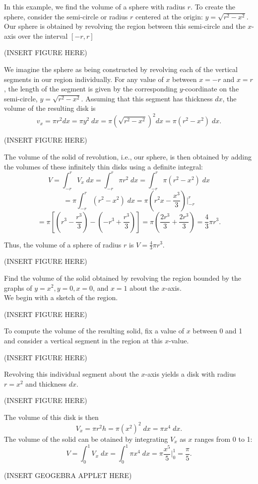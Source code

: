 \documentclass{ximera}
\begin{document}
\begin{example}
In this example, we find the volume of a sphere with radius $r$.
To create the sphere, consider the semi-circle or radius $r$ centered at the origin: $y = \sqrt{r^2 - x^2}$.
Our sphere is obtained by revolving the region between this semi-circle and the $x$-axis over the interval $[-r,r]$

(INSERT FIGURE HERE)

We imagine the sphere as being constructed by revolving each of the vertical segments in our region individually.
For any value of $x$ between $x = -r$ and $x = r$, the length of the segment is given by the corresponding $y$-coordinate
on the semi-circle, $y = \sqrt{r^2 - x^2}$. Assuming that this segment has thickness $dx$, the volume of the resulting disk is 
\[
v_x = \pi r^2 dx = \pi y^2 \; dx = \pi \left(\sqrt{r^2 - x^2}\right)^2 dx = \pi (r^2 - x^2)\; dx.
\]

(INSERT FIGURE HERE)

The volume of the solid of revolution, i.e., our sphere, is then obtained by adding the volumes of these infinitely thin disks using a definite integral:
\[
V = \int_{-r}^r V_x \; dx = \int_{-r}^r \pi r^2 \; dx = \int_{-r}^r \pi (r^2 - x^2) \; dx 
\]
\[
= \pi \int_{-r}^r  (r^2 - x^2) \; dx = \pi  \left(r^2 x - \frac{x^3}{3}\right)\bigg|_{-r}^r 
\]
\[
= \pi \left[ \left(r^3 - \frac{r^3}{3}\right) - \left(-r^3 + \frac{r^3}{3}\right)\right] = \pi \left(\frac{2r^3}{3} + \frac{2r^3}{3}\right) = \frac43 \pi r^3.
\]

Thus, the volume of a sphere of radius $r$ is $V = \frac43 \pi r^3$.

(INSERT FIGURE HERE)

\end{example}

\begin{example} Find the volume of the solid obtained by revolving the region bounded by the graphs of $y=x^2, y=0, x=0$, and $x = 1$
about the $x$-axis.\\
We begin with a sketch of the region.

(INSERT FIGURE HERE)

To compute the volume of the resulting solid, fix a value of $x$ between 0 and 1 and consider a vertical segment in the region at this $x$-value.

(INSERT FIGURE HERE)

Revolving this individual segment about the $x$-axis yields a disk with radius $r = x^2$ and thickness $dx$. 

(INSERT FIGURE HERE)

The volume of this disk is then
\[
V_x = \pi r^2 h = \pi (x^2)^2 \; dx = \pi x^4 \; dx.
\]
The volume of the solid can be otained by integrating $V_x$ as $x$ ranges from 0 to 1:
\[
V = \int_0^1 V_x \; dx = \int_0^1 \pi x^4 \; dx = \pi \frac{x^5}{5}\bigg|_0^1 = \frac{\pi}{5}.
\]

(INSERT GEOGEBRA APPLET HERE)

\end{example}
\end{document}
